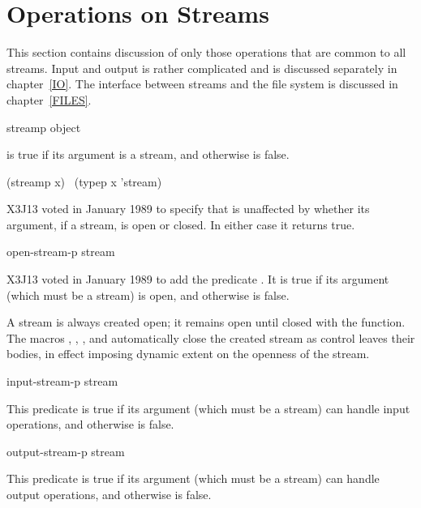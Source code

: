 \section {Operations on Streams}

This section contains discussion of only those operations that
are common to all streams.  Input and output is rather complicated
and is discussed separately in chapter~\ref{IO}.
The interface between streams and the file system is discussed
in chapter~\ref{FILES}.

\begin{defun}[Function]
streamp object

 is true if its argument is a stream,
and otherwise is false.
\begin{lisp}
(streamp x) \EQ\ (typep x 'stream)
\end{lisp}

\begin{new}
X3J13 voted in January 1989
to specify that  is unaffected
by whether its argument, if a stream, is open or closed.  In either case
it returns true.
\end{new}
\end{defun}

\begin{newer}
\begin{defun}[Function]
open-stream-p stream

X3J13 voted in January 1989 
to add the predicate .
It is true if its argument (which must be a stream)
is open, and otherwise is false.

A stream is always created open; it remains open until closed
with the  function.  The macros ,
, ,
and  automatically close the created stream
as control leaves their bodies, in effect imposing dynamic extent
on the openness of the stream.
\end{defun}
\end{newer}

\begin{defun}[Function]
input-stream-p stream

This predicate is true if its argument (which must be a stream) can handle
input operations, and otherwise is false.
\end{defun}

\begin{defun}[Function]
output-stream-p stream

This predicate is true if its argument (which must be a stream) can handle
output operations, and otherwise is false.
\end{defun}

